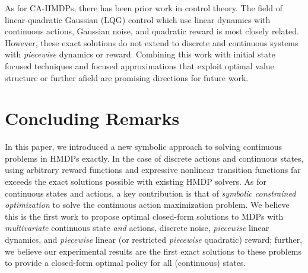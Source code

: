 \documentclass[twoside,11pt]{article}
\newcommand{\InventoryControl}{\textsc{Inventory Control }}
\begin{document}
As for CA-HMDPs, there has been prior work in control theory. The field of linear-quadratic Gaussian (LQG) control \cite{lqgc} which use linear dynamics with continuous actions, Gaussian noise, and quadratic
reward is most closely related.  However, these exact solutions do
not extend to discrete and continuous systems with \emph{piecewise}
dynamics or reward.
%
Combining this work with initial state focused techniques \cite{hao09}
and focused approximations that exploit optimal value
structure \cite{apricodd} or further
afield \cite{munos02,kveton06,phase07} are promising directions for
future work.


\section{Concluding Remarks}

In this paper, we introduced a new symbolic approach to solving continuous problems in HMDPs exactly. In the case of discrete actions and continuous states, using arbitrary
reward functions and expressive nonlinear transition functions far exceeds the exact solutions possible with existing HMDP
solvers.  
As for continuous states and actions, a key contribution is that of \emph{symbolic constrained
optimization} to solve the continuous action maximization problem. We
believe this is the first work to propose optimal closed-form
solutions to MDPs with \emph{multivariate} continuous state \emph{and}
actions, discrete noise, \emph{piecewise} linear dynamics, and
\emph{piecewise} linear (or restricted \emph{piecewise} quadratic)
reward; further, we believe our experimental results are the first
exact solutions to these problems to provide a closed-form optimal
policy for all (continuous) states.
\end{document}
